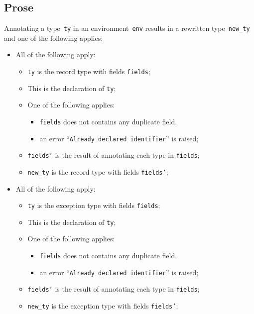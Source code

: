 \documentclass{book}
\begin{document}
\begin{itemize}
\subsection{Prose}
Annotating a type~\texttt{ty} in an environment~\texttt{env} results in a
rewritten type~\texttt{new\_ty} and one of the following applies:
\begin{itemize}
  \item All of the following apply:
    \begin{itemize}
      \item \texttt{ty} is the record type with fields \texttt{fields};
      \item This is the declaration of \texttt{ty};
      \item One of the following applies:
        \begin{itemize}
          \item \texttt{fields} does not contains any duplicate field.
          \item an error ``\texttt{Already declared identifier}'' is raised;
        \end{itemize}
      \item \texttt{fields'} is the result of annotating each type in
        \texttt{fields};
      \item \texttt{new\_ty} is the record type with fields \texttt{fields'};
    \end{itemize}
  \item All of the following apply:
    \begin{itemize}
      \item \texttt{ty} is the exception type with fields \texttt{fields};
      \item This is the declaration of \texttt{ty};
      \item One of the following applies:
        \begin{itemize}
          \item \texttt{fields} does not contains any duplicate field.
          \item an error ``\texttt{Already declared identifier}'' is raised;
        \end{itemize}
      \item \texttt{fields'} is the result of annotating each type in
        \texttt{fields};
      \item \texttt{new\_ty} is the exception type with fields \texttt{fields'};
    \end{itemize}
\end{itemize}



\end{itemize}
\end{document}
